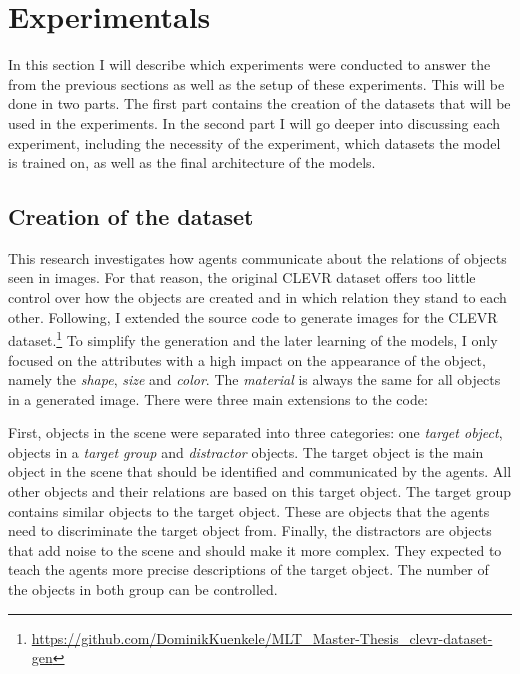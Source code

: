 \section{Experimentals}
\label{sec:exp-setup}


In this section I will describe which experiments were conducted to answer the  from the previous sections as well as the setup of these experiments.
This will be done in two parts.
The first part contains the creation of the datasets that will be used in the experiments.
In the second part I will go deeper into discussing each experiment, including the necessity of the experiment, which datasets the model is trained on, as well as the final architecture of the models.

\subsection{Creation of the dataset}

This research investigates how agents communicate about the relations of objects seen in images.
For that reason, the original CLEVR dataset offers too little control over how the objects are created and in which relation they stand to each other.
Following, I extended the source code to generate images for the CLEVR dataset.\footnote{\href{https://github.com/DominikKuenkele/MLT\_Master-Thesis\_clevr-dataset-gen}{https://github.com/DominikKuenkele/MLT\_Master-Thesis\_clevr-dataset-gen}}
To simplify the generation and the later learning of the models, I only focused on the attributes with a high impact on the appearance of the object, namely the \emph{shape}, \emph{size} and \emph{color}.
The \emph{material} is always the same for all objects in a generated image.
There were three main extensions to the code:

First, objects in the scene were separated into three categories: one \emph{target object}, objects in a \emph{target group} and \emph{distractor} objects.
The target object is the main object in the scene that should be identified and communicated by the agents.
All other objects and their relations are based on this target object.
The target group contains similar objects to the target object.
These are objects that the agents need to discriminate the target object from.
Finally, the distractors are objects that add noise to the scene and should make it more complex. They expected to teach the agents more precise descriptions of the target object.
The number of the objects in both group can be controlled.

